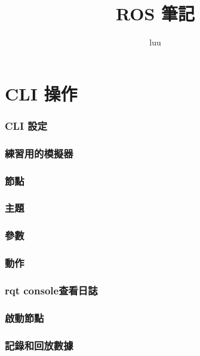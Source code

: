 \documentclass{article}
\title{ROS 筆記}
\author{luu}
\date{} %
\begin{document}
\maketitle
\tableofcontents

\part{CLI 操作}
\section{CLI 設定}

\section{練習用的模擬器}

\section{節點}

\section{主題}

\section{參數}

\section{動作}

\section{rqt console查看日誌}

\section{啟動節點}

\section{記錄和回放數據}

\end{document}

